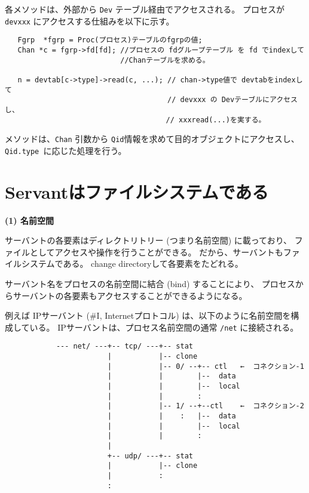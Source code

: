 {{\begin{verbatim}
\end{verbatim}
}


各メソッドは、外部から {\tt Dev} テーブル経由でアクセスされる。
プロセスが {\tt devxxx} にアクセスする仕組みを以下に示す。

\begin{verbatim}
   Fgrp  *fgrp = Proc(プロセス)テーブルのfgrpの値;
   Chan *c = fgrp->fd[fd]; //プロセスの fdグループテーブル を fd でindexして
                           //Chanテーブルを求める。

   n = devtab[c->type]->read(c, ...); // chan->type値で devtabをindexして
                                      // devxxx の Devテーブルにアクセスし、
　                                    // xxxread(...)を実する。
\end{verbatim}

メソッドは、{\tt Chan} 引数から {\tt Qid}情報を求めて目的オブジェクトにアクセスし、
{\tt Qid.type }に応じた処理を行う。


\section{Servantはファイルシステムである}

{\bf\flushleft   (1) 名前空間}

  サーバントの各要素はディレクトリトリー (つまり名前空間) に載っており、
ファイルとしてアクセスや操作を行うことができる。
だから、サーバントもファイルシステムである。
change directoryして各要素をたどれる。

サーバント名をプロセスの名前空間に結合 (bind) することにより、
プロセスからサーバントの各要素もアクセスすることができるようになる。

例えば  IPサーバント (\#I, Internetプロトコル) は、以下のように名前空間を構成している。
IPサーバントは、プロセス名前空間の通常 {\tt /net} に接続される。

{\small
\begin{verbatim}
            --- net/ ---+-- tcp/ ---+-- stat               
                        |           |-- clone        
                        |           |-- 0/ --+-- ctl   ←  コネクション-1 
                        |           |        |--  data                
                        |           |        |--  local               
                        |           |        :                       
                        |           |-- 1/ --+--ctl    ←  コネクション-2    
                        |           |    :   |--  data  
                        |           |        |--  local 
                        |           |        :         
                        |                        
                        +-- udp/ ---+-- stat         
                        |           |-- clone        
                        |           :          
                        :                        
\end{verbatim}
}
                                                       
}
